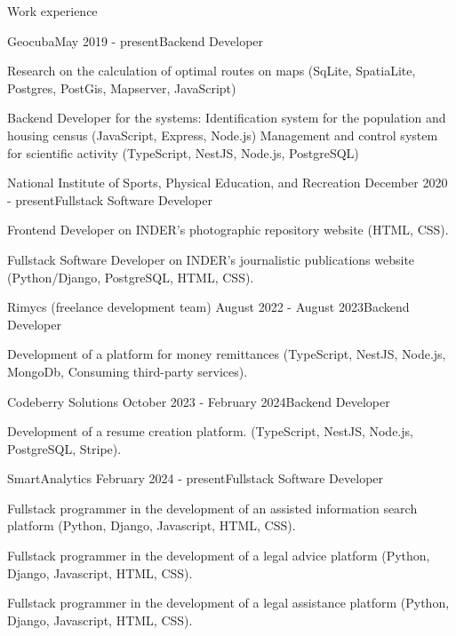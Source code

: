 \documentclass{resume}
\begin{document}
	\begin{rSection}{Work experience}
		\begin{rSubsection}{Geocuba}{May 2019 - present}{Backend Developer}{}
			\item Research on the calculation of optimal routes on maps
				\subitem (SqLite, SpatiaLite, Postgres, PostGis, Mapserver, JavaScript)
			\item Backend Developer for the systems: 
				\subitem Identification system for the population and housing census 
					\subsubitem(JavaScript, Express, Node.js)
				\subitem Management and control system for scientific activity
					\subsubitem(TypeScript, NestJS, Node.js, PostgreSQL)
		\end{rSubsection}
	
		\begin{rSubsection}{National Institute of Sports, Physical Education, and Recreation}{ December 2020 - present}{Fullstack Software Developer}{}
			\item Frontend Developer on INDER's photographic repository website 
				\subitem(HTML, CSS).
			\newline	
			\item Fullstack Software Developer on INDER's journalistic publications website 
				\subitem(Python/Django, PostgreSQL, HTML, CSS).
		\end{rSubsection}
		
		\begin{rSubsection}{Rimycs (freelance development team)}{ August 2022 - August 2023}{Backend Developer}{}
			\item Development of a platform for money remittances
			\subitem(TypeScript, NestJS, Node.js, MongoDb, Consuming third-party services).
			
		\end{rSubsection}
	
		\begin{rSubsection}{Codeberry Solutions}{ October 2023 - February 2024}{Backend Developer}{}
			\item Development of a resume creation platform.
			\subitem(TypeScript, NestJS, Node.js, PostgreSQL, Stripe).
			
		\end{rSubsection}
		
		\begin{rSubsection}{SmartAnalytics}{ February 2024 - present}{Fullstack Software Developer}{}
			\item Fullstack programmer in the development of an assisted information search platform
			\subitem(Python, Django, Javascript, HTML, CSS).
			\item Fullstack programmer in the development of a legal advice platform
			\subitem(Python, Django, Javascript, HTML, CSS).
			\item Fullstack programmer in the development of a legal assistance platform
			\subitem(Python, Django, Javascript, HTML, CSS).
			
		\end{rSubsection}	
		
	\end{rSection}
\end{document}
